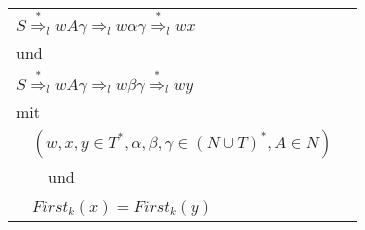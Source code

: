 \documentclass[
    border=0.2cm,
    convert={density=600}
]{standalone}
\begin{document}
		\begin{tabular}{lp{11 cm}}
$S \overset{*}{\Rightarrow}_l wA \gamma {\Rightarrow}_l w\alpha\gamma \overset{*}{\Rightarrow}_l wx$ \\

und\\

$S \overset{*}{\Rightarrow}_l wA \gamma {\Rightarrow}_l w\beta\gamma \overset{*}{\Rightarrow}_l wy$\\


mit\\
\ \  $(w, x, y \in T^*, \alpha, \beta, \gamma \in (N \cup T)^*, A \in N)$\\
 \ \ \ \  und \\
\ \  $First_k(x) = First_k(y)$ \\
\end{tabular}
\end{document}
